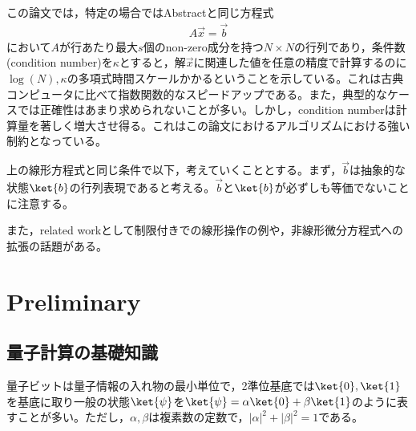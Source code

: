 \documentclass[b5paper,papersize,dvipdfmx,fleqn]{jsarticle}
\begin{document}

この論文では，特定の場合ではAbstractと同じ方程式
\begin{eqnarray}
  A\vec{x} = \vec{b}
\end{eqnarray}
において$A$が行あたり最大$s$個のnon-zero成分を持つ$N\times N$の行列であり，条件数(condition number)を$\kappa $とすると，解$\vec{x}$に関連した値を任意の精度で計算するのに$\log(N),\kappa $の多項式時間スケールかかるということを示している。これは古典コンピュータに比べて指数関数的なスピードアップである。また，典型的なケースでは正確性はあまり求められないことが多い。しかし，condition numberは計算量を著しく増大させ得る。これはこの論文におけるアルゴリズムにおける強い制約となっている。

上の線形方程式と同じ条件で以下，考えていくこととする。まず，$\vec{b}$は抽象的な状態$\ket{b}$の行列表現であると考える。$\vec{b}$と$\ket{b}$が必ずしも等価でないことに注意する。

%


また，related workとして制限付きでの線形操作の例や，非線形微分方程式への拡張の話題がある。

\section{Preliminary}
\subsection{量子計算の基礎知識}
量子ビットは量子情報の入れ物の最小単位で，2準位基底では$\ket{0}, \ket{1}$を基底に取り一般の状態$\ket{\psi }$を$\ket{\psi }= \alpha \ket{0}+\beta \ket{1}$のように表すことが多い。ただし，$\alpha, \beta$は複素数の定数で，$|\alpha|^2 + |\beta|^2 = 1$である。
\end{document}
